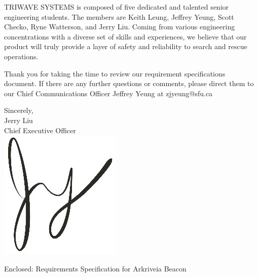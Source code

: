 \documentclass[11pt]{letter}
\begin{document}
\begin{letter}
\medskip
TRIWAVE SYSTEMS is composed of five dedicated and talented senior engineering students. The members are Keith Leung, Jeffrey Yeung, Scott Checko, Ryne Watterson, and Jerry Liu. Coming from various engineering concentrations with a diverse set of skills and experiences, we believe that our product will truly provide a layer of safety and reliability to search and rescue operations.

\medskip
Thank you for taking the time to review our requirement specifications document. If there are any further questions or comments, please direct them to our Chief Communications Officer Jeffrey Yeung at zjyeung@sfu.ca

\medskip
Sincerely,\\
Jerry Liu\\
Chief Executive Officer\\

\vspace*{-0.25cm}
\includegraphics[scale=0.8]{./images/signature.jpg}

{Enclosed: Requirements Specification for Arkriveia Beacon}

\end{letter}
\end{document}
